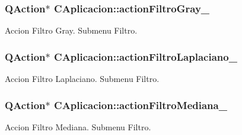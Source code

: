 \subsubsection[{\texorpdfstring{action\+Filtro\+Gray\+\_\+}{actionFiltroGray_}}]{\setlength{\rightskip}{0pt plus 5cm}Q\+Action$\ast$ C\+Aplicacion\+::action\+Filtro\+Gray\+\_\+\hspace{0.3cm}{\ttfamily [private]}}\hypertarget{classCAplicacion_a62326cfe231c222d4d3411b4f9a5fc81}{}\label{classCAplicacion_a62326cfe231c222d4d3411b4f9a5fc81}


Accion Filtro Gray. Submenu Filtro. 

\subsubsection[{\texorpdfstring{action\+Filtro\+Laplaciano\+\_\+}{actionFiltroLaplaciano_}}]{\setlength{\rightskip}{0pt plus 5cm}Q\+Action$\ast$ C\+Aplicacion\+::action\+Filtro\+Laplaciano\+\_\+\hspace{0.3cm}{\ttfamily [private]}}\hypertarget{classCAplicacion_ad1cce3c330ee913f1129d19bba5f22f0}{}\label{classCAplicacion_ad1cce3c330ee913f1129d19bba5f22f0}


Accion Filtro Laplaciano. Submenu Filtro. 

\subsubsection[{\texorpdfstring{action\+Filtro\+Mediana\+\_\+}{actionFiltroMediana_}}]{\setlength{\rightskip}{0pt plus 5cm}Q\+Action$\ast$ C\+Aplicacion\+::action\+Filtro\+Mediana\+\_\+\hspace{0.3cm}{\ttfamily [private]}}\hypertarget{classCAplicacion_a7121918f17fc9640c91f26961f7ee221}{}\label{classCAplicacion_a7121918f17fc9640c91f26961f7ee221}


Accion Filtro Mediana. Submenu Filtro. 

